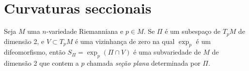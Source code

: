 





\section{Curvaturas seccionais}

\begin{definicao}
	Seja $M$ uma $n$-variedade Riemanniana e $p \in M$. Se $\Pi$ é um subespaço de $T_p M$ de dimensão 2, e $V \subset T_p M$ é uma vizinhança de zero  na qual $\exp_p$ é um difeomorfismo, então $S_{\Pi} = \exp_p(\Pi \cap V)$ é uma subvariedade de $M$ de dimensão 2 que contem a  $p$ chamada \emph{seção plana} determinada por $\Pi$.
\end{definicao}

